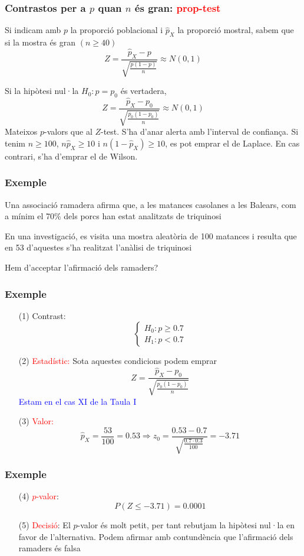 \documentclass[12pt,t]{beamer}\usepackage[]{graphicx}\usepackage[]{color}
\newcommand{\red}[1]{\textcolor{red}{#1}}
\newcommand{\blue}[1]{\textcolor{blue}{#1}}
\renewcommand{\emph}[1]{{\color{red}#1}}
\renewcommand{\leq}{\leqslant}
\renewcommand{\geq}{\geqslant}
\theoremstyle{plain}
\theoremstyle{definition}
\begin{document}
\begin{frame}
\frametitle{Contrastos per a $p$ quan $n$ és gran: \red{prop-test}}

Si indicam amb $p$  la proporció poblacional i  $\widehat{p}_X$ la
proporció mostral, sabem que si la mostra és gran $(n\geq 40)$
$$
Z=\frac{\widehat{p}_X-p}{\sqrt{\frac{p(1-p)}{n}}}\approx N(0,1)
$$
\medskip

Si la hipòtesi nul·la $H_{0}:p=p_{0}$ és vertadera, 
$$
Z=\frac{\widehat{p}_X-p_0}{\sqrt{\frac{p_0(1-p_0)}{n}}}\approx N(0,1)
$$
Mateixos $p$-valors que al $Z$-test. S'ha d'anar alerta amb l'interval de confiança. Si tenim $n\geq 100$, $n\hat{p}_X\geq 10$ i $n(1-\hat{p}_X)\geq 10$, es pot emprar el de Laplace. En cas contrari, s'ha d'emprar el de Wilson.
\end{frame}


\begin{frame}
\frametitle{Exemple}

Una associació ramadera afirma que, a les matances casolanes a les Balears,
com a mínim el 70\% dels porcs han estat analitzats de triquinosi
\medskip

En una investigació, es visita una mostra aleatòria de 100 matances i resulta que en 53 d'aquestes
 s'ha realitzat l'anàlisi de triquinosi
\medskip

Hem d'acceptar l'afirmació dels ramaders? 
\end{frame}

\begin{frame}
\frametitle{Exemple}
\begin{itemize}
\item[(1)]  \emph{Contrast:}
$$\left\{\begin{array}{l}
H_{0}:p\geq 0.7\\
H_{1}:p<0.7
\end{array}
\right.$$

\item[(2)] \red{Estadístic:} Sota aquestes condicions podem emprar
$$
Z=\frac{\widehat{p}_X-p_0}{\sqrt{\frac{p_0(1-p_0)}{n}}}
$$
\blue{Estam en el cas XI de la Taula I}\pause

\item[(3)] \red{Valor:} 
$$
\widehat{p}_X=\frac{53}{100}=0.53\Longrightarrow 
z_0=\frac{0.53-0.7}{\sqrt{\frac{0.7\cdot 0.3}{100}}}=-3.71
$$
\end{itemize}

\end{frame}

\begin{frame}
\frametitle{Exemple}
\begin{itemize}


\item[(4)] \red{$p$-valor}:
$$
P(Z\leq -3.71)=0.0001
$$


\item[(5)] \red{Decisió}: El $p$-valor és molt petit, per tant rebutjam la hipòtesi nul·la en favor de l'alternativa. Podem afirmar amb contundència que l'afirmació dels ramaders és falsa

\end{itemize}
\end{frame}
\end{document}

